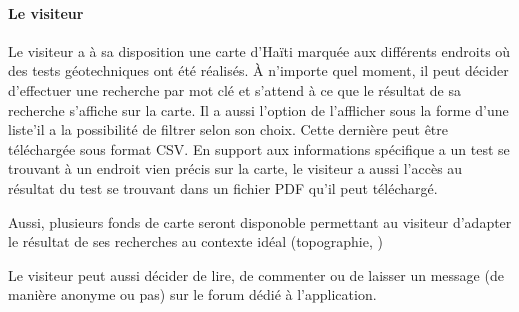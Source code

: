                 \paragraph{Le visiteur}
                Le visiteur a à sa disposition une carte d'Haïti marquée aux différents endroits où des tests 
                géotechniques ont été réalisés.
                À n'importe quel moment, il peut décider d'effectuer une recherche par mot clé et s'attend
                à ce que le résultat de sa recherche s'affiche sur la carte. Il a aussi l'option de l'afflicher sous la forme
                d'une liste'il a la possibilité de filtrer selon son choix. Cette dernière peut être téléchargée sous format CSV.
                En support aux informations spécifique a un test se trouvant à un endroit vien précis sur la carte,
                le visiteur a aussi l'accès au résultat du test se trouvant dans un fichier PDF qu'il peut téléchargé.
                \par
                Aussi, plusieurs fonds de carte seront disponoble permettant au visiteur d'adapter le résultat de ses recherches
                au contexte idéal (topographie, )
                \par
                Le visiteur peut aussi décider de lire, de commenter ou de laisser un message (de manière anonyme ou pas) sur le forum dédié à l'application.
